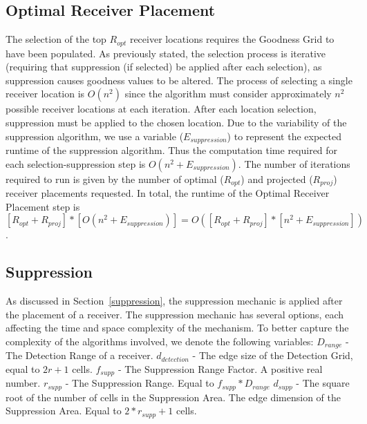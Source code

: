 \subsection{Optimal Receiver Placement}
The selection of the top $R_{opt}$ receiver locations requires the Goodness Grid to have been populated.  As previously stated, the selection process is iterative (requiring that suppression (if selected) be applied after each selection), as suppression causes goodness values to be altered.  The process of selecting a single receiver location is $O(n^2)$ since the algorithm must consider approximately $n^2$ possible receiver locations at each iteration.  After each location selection, suppression must be applied to the chosen location.  Due to the variability of the suppression algorithm, we use a variable  ($E_{suppression}$) to represent the expected runtime of the suppression algorithm.  Thus the computation time required for each selection-suppression step is $O(n^2 + E_{suppression})$.  The number of iterations required to run is given by the number of optimal ($R_{opt}$) and projected ($R_{proj}$) receiver placements requested.  In total, the runtime of the Optimal Receiver Placement step is $[R_{opt} + R_{proj}] * [O(n^2 + E_{suppression})] = O([R_{opt} + R_{proj}]* [n^2 + E_{suppression}])$.


\subsection{Suppression}
As discussed in Section~\ref{suppression}, the suppression mechanic is applied after the placement of a receiver.  The suppression mechanic has several options, each affecting the time and space complexity of the mechanism.  To better capture the complexity of the algorithms involved, we denote the following variables: \newline
$D_{range}$ - The Detection Range of a receiver.\newline
$d_{detection}$ - The edge size of the Detection Grid, equal to $2r+1$ cells.\newline
$f_{supp}$ - The Suppression Range Factor.  A positive real number. \newline
$r_{supp}$ - The Suppression Range. Equal to $f_{supp}*D_{range}$\newline
$d_{supp}$ - The square root of the number of cells in the Suppression Area.  The edge dimension of the Suppression Area.  Equal to $2*r_{supp} + 1$ cells.\newline

